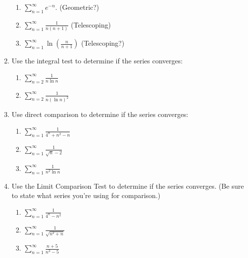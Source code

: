 \documentclass[12pt]{article}
\newcommand{\di}{\displaystyle}
\begin{document}
\begin{enumerate}
\begin{multicols}{2}
\begin{enumerate}
 \item $\di \sum_{n=1}^\infty e^{-n}$. (Geometric?)
 \item $\di \sum_{n=1}^\infty \frac{1}{n(n+1)}$ (Telescoping)
 \item $\di \sum_{n=1}^\infty \ln\left(\frac{n}{n+1}\right)$ (Telescoping?)
\end{enumerate}
\end{multicols}
\item Use the integral test to determine if the series converges:
\begin{multicols}{2}
 \begin{enumerate}
  \item $\di \sum_{n=2}^\infty\frac{1}{n\ln n}$
  \item $\di \sum_{n=2}^\infty\frac{1}{n(\ln n)^2}$
 \end{enumerate}
\end{multicols}
\item Use direct comparison to determine if the series converges:
\begin{multicols}{3}
\begin{enumerate}
 \item $\di \sum_{n=1}^\infty \frac{1}{4^n+n^2-n}$
 \item $\di \sum_{n=1}^\infty \frac{1}{\sqrt{n}-2}$
 \item $\di \sum_{n=1}^\infty \frac{1}{n^2\ln n}$
\end{enumerate}
\end{multicols}
\item Use the Limit Comparison Test to determine if the series converges. (Be sure to state what series you're using for comparison.)
\begin{multicols}{3}
 \begin{enumerate}
  \item $\di \sum_{n=1}^\infty \frac{1}{4^n-n^2}$
  \item $\di \sum_{n=1}^\infty \frac{1}{\sqrt{n^2+n}}$
  \item $\di \sum_{n=1}^\infty \frac{n+5}{n^3-5}$
 \end{enumerate}
\end{multicols}


\end{enumerate}
\end{document}
